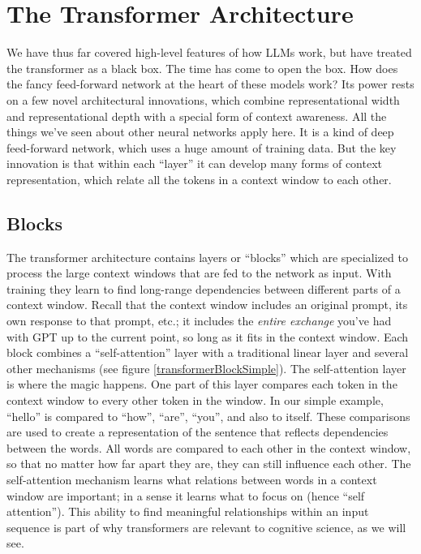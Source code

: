 \section{The Transformer Architecture}\label{transformers}

We have thus far covered high-level features of how LLMs work, but have treated the transformer as a black box.  The time has come to open the box. How does the fancy feed-forward network at the heart of these models work? Its power rests on a few novel architectural innovations, which combine representational width and representational depth with a special form of context awareness. All the things we've seen about other neural networks apply here. It is a kind of deep feed-forward network, which uses a huge amount of training data. But the key innovation is that within each ``layer'' it can develop many forms of context representation, which relate all the tokens in a context window to each other.

\subsection{Blocks}


The transformer architecture \cite{vaswani2017attention} contains layers or ``blocks'' which are specialized to process the large context windows that are fed to the network as input. With training they learn to find long-range dependencies between different parts of a context window. Recall that the context window  includes an original prompt, its own response to that prompt, etc.; it includes the \emph{entire exchange} you've had with GPT up to the current point, so long as it fits in the context window. Each block combines  a ``self-attention'' layer with a traditional linear layer and several other mechanisms (see figure \ref{transformerBlockSimple}). The self-attention layer is where the magic happens. One part of this layer compares each token in the context window to every other token in the window. In our simple example, ``hello'' is compared to ``how'', ``are'',  ``you'', and also to itself. These comparisons are used to create a representation of the sentence that reflects dependencies between the words. All words are compared to each other in the context window, so that no matter how far apart they are, they can still influence each other. The self-attention mechanism learns what relations between words in a context window are important; in a sense it learns what to focus on (hence ``self attention''). This ability to find meaningful relationships within an input sequence is part of why transformers are relevant to cognitive science, as we will see.


